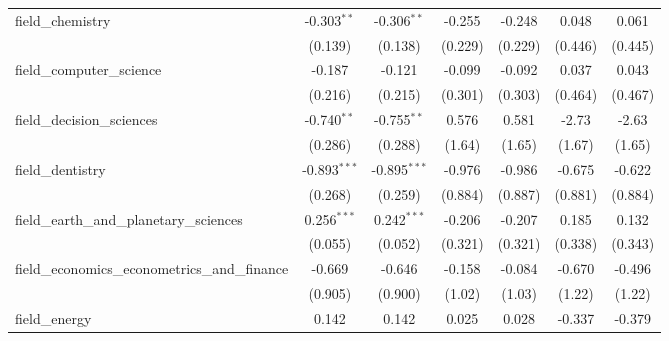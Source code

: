 \begin{tabular}{lcccccc}
   field\_chemistry                                            & -0.303$^{**}$  & -0.306$^{**}$  & -0.255         & -0.248         & 0.048          & 0.061\\   
                                                               & (0.139)        & (0.138)        & (0.229)        & (0.229)        & (0.446)        & (0.445)\\   
   field\_computer\_science                                    & -0.187         & -0.121         & -0.099         & -0.092         & 0.037          & 0.043\\   
                                                               & (0.216)        & (0.215)        & (0.301)        & (0.303)        & (0.464)        & (0.467)\\   
   field\_decision\_sciences                                   & -0.740$^{**}$  & -0.755$^{**}$  & 0.576          & 0.581          & -2.73          & -2.63\\   
                                                               & (0.286)        & (0.288)        & (1.64)         & (1.65)         & (1.67)         & (1.65)\\   
   field\_dentistry                                            & -0.893$^{***}$ & -0.895$^{***}$ & -0.976         & -0.986         & -0.675         & -0.622\\   
                                                               & (0.268)        & (0.259)        & (0.884)        & (0.887)        & (0.881)        & (0.884)\\   
   field\_earth\_and\_planetary\_sciences                      & 0.256$^{***}$  & 0.242$^{***}$  & -0.206         & -0.207         & 0.185          & 0.132\\   
                                                               & (0.055)        & (0.052)        & (0.321)        & (0.321)        & (0.338)        & (0.343)\\   
   field\_economics\_econometrics\_and\_finance                & -0.669         & -0.646         & -0.158         & -0.084         & -0.670         & -0.496\\   
                                                               & (0.905)        & (0.900)        & (1.02)         & (1.03)         & (1.22)         & (1.22)\\   
   field\_energy                                               & 0.142          & 0.142          & 0.025          & 0.028          & -0.337         & -0.379\\   

\end{tabular}
